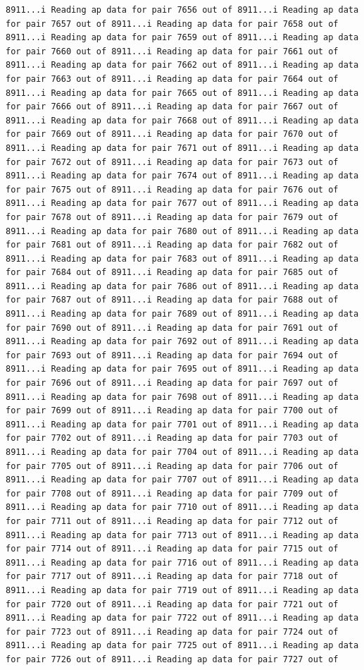 \documentclass[
]{article}
\begin{document}
\begin{verbatim}
8911...i Reading ap data for pair 7656 out of 8911...i Reading ap data for pair 7657 out of 8911...i Reading ap data for pair 7658 out of 8911...i Reading ap data for pair 7659 out of 8911...i Reading ap data for pair 7660 out of 8911...i Reading ap data for pair 7661 out of 8911...i Reading ap data for pair 7662 out of 8911...i Reading ap data for pair 7663 out of 8911...i Reading ap data for pair 7664 out of 8911...i Reading ap data for pair 7665 out of 8911...i Reading ap data for pair 7666 out of 8911...i Reading ap data for pair 7667 out of 8911...i Reading ap data for pair 7668 out of 8911...i Reading ap data for pair 7669 out of 8911...i Reading ap data for pair 7670 out of 8911...i Reading ap data for pair 7671 out of 8911...i Reading ap data for pair 7672 out of 8911...i Reading ap data for pair 7673 out of 8911...i Reading ap data for pair 7674 out of 8911...i Reading ap data for pair 7675 out of 8911...i Reading ap data for pair 7676 out of 8911...i Reading ap data for pair 7677 out of 8911...i Reading ap data for pair 7678 out of 8911...i Reading ap data for pair 7679 out of 8911...i Reading ap data for pair 7680 out of 8911...i Reading ap data for pair 7681 out of 8911...i Reading ap data for pair 7682 out of 8911...i Reading ap data for pair 7683 out of 8911...i Reading ap data for pair 7684 out of 8911...i Reading ap data for pair 7685 out of 8911...i Reading ap data for pair 7686 out of 8911...i Reading ap data for pair 7687 out of 8911...i Reading ap data for pair 7688 out of 8911...i Reading ap data for pair 7689 out of 8911...i Reading ap data for pair 7690 out of 8911...i Reading ap data for pair 7691 out of 8911...i Reading ap data for pair 7692 out of 8911...i Reading ap data for pair 7693 out of 8911...i Reading ap data for pair 7694 out of 8911...i Reading ap data for pair 7695 out of 8911...i Reading ap data for pair 7696 out of 8911...i Reading ap data for pair 7697 out of 8911...i Reading ap data for pair 7698 out of 8911...i Reading ap data for pair 7699 out of 8911...i Reading ap data for pair 7700 out of 8911...i Reading ap data for pair 7701 out of 8911...i Reading ap data for pair 7702 out of 8911...i Reading ap data for pair 7703 out of 8911...i Reading ap data for pair 7704 out of 8911...i Reading ap data for pair 7705 out of 8911...i Reading ap data for pair 7706 out of 8911...i Reading ap data for pair 7707 out of 8911...i Reading ap data for pair 7708 out of 8911...i Reading ap data for pair 7709 out of 8911...i Reading ap data for pair 7710 out of 8911...i Reading ap data for pair 7711 out of 8911...i Reading ap data for pair 7712 out of 8911...i Reading ap data for pair 7713 out of 8911...i Reading ap data for pair 7714 out of 8911...i Reading ap data for pair 7715 out of 8911...i Reading ap data for pair 7716 out of 8911...i Reading ap data for pair 7717 out of 8911...i Reading ap data for pair 7718 out of 8911...i Reading ap data for pair 7719 out of 8911...i Reading ap data for pair 7720 out of 8911...i Reading ap data for pair 7721 out of 8911...i Reading ap data for pair 7722 out of 8911...i Reading ap data for pair 7723 out of 8911...i Reading ap data for pair 7724 out of 8911...i Reading ap data for pair 7725 out of 8911...i Reading ap data for pair 7726 out of 8911...i Reading ap data for pair 7727 out of 
\end{verbatim}
\end{document}
